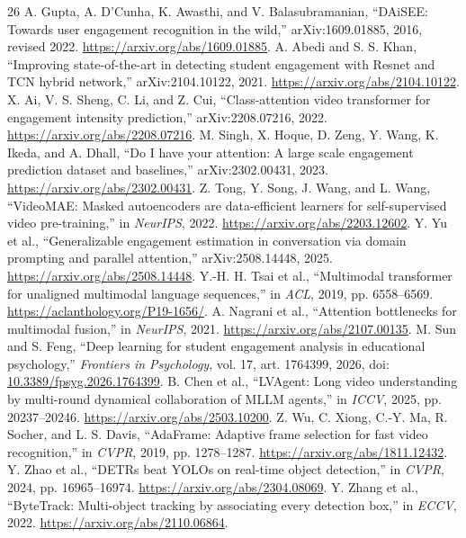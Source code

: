 \documentclass[a4paper,conference]{IEEEtran}
\begin{document}
\begin{thebibliography}{26}
 A. Gupta, A. D'Cunha, K. Awasthi, and V. Balasubramanian, ``DAiSEE: Towards user engagement recognition in the wild,'' arXiv:1609.01885, 2016, revised 2022. \url{https://arxiv.org/abs/1609.01885}.
 A. Abedi and S. S. Khan, ``Improving state-of-the-art in detecting student engagement with Resnet and TCN hybrid network,'' arXiv:2104.10122, 2021. \url{https://arxiv.org/abs/2104.10122}.
 X. Ai, V. S. Sheng, C. Li, and Z. Cui, ``Class-attention video transformer for engagement intensity prediction,'' arXiv:2208.07216, 2022. \url{https://arxiv.org/abs/2208.07216}.
 M. Singh, X. Hoque, D. Zeng, Y. Wang, K. Ikeda, and A. Dhall, ``Do I have your attention: A large scale engagement prediction dataset and baselines,'' arXiv:2302.00431, 2023. \url{https://arxiv.org/abs/2302.00431}.
 Z. Tong, Y. Song, J. Wang, and L. Wang, ``VideoMAE: Masked autoencoders are data-efficient learners for self-supervised video pre-training,'' in \emph{NeurIPS}, 2022. \url{https://arxiv.org/abs/2203.12602}.
 Y. Yu et al., ``Generalizable engagement estimation in conversation via domain prompting and parallel attention,'' arXiv:2508.14448, 2025. \url{https://arxiv.org/abs/2508.14448}.
 Y.-H. H. Tsai et al., ``Multimodal transformer for unaligned multimodal language sequences,'' in \emph{ACL}, 2019, pp. 6558--6569. \url{https://aclanthology.org/P19-1656/}.
 A. Nagrani et al., ``Attention bottlenecks for multimodal fusion,'' in \emph{NeurIPS}, 2021. \url{https://arxiv.org/abs/2107.00135}.
 M. Sun and S. Feng, ``Deep learning for student engagement analysis in educational psychology,'' \emph{Frontiers in Psychology}, vol. 17, art. 1764399, 2026, doi: \href{https://doi.org/10.3389/fpsyg.2026.1764399}{10.3389/fpsyg.2026.1764399}.
 B. Chen et al., ``LVAgent: Long video understanding by multi-round dynamical collaboration of MLLM agents,'' in \emph{ICCV}, 2025, pp. 20237--20246. \url{https://arxiv.org/abs/2503.10200}.
 Z. Wu, C. Xiong, C.-Y. Ma, R. Socher, and L. S. Davis, ``AdaFrame: Adaptive frame selection for fast video recognition,'' in \emph{CVPR}, 2019, pp. 1278--1287. \url{https://arxiv.org/abs/1811.12432}.
 Y. Zhao et al., ``DETRs beat YOLOs on real-time object detection,'' in \emph{CVPR}, 2024, pp. 16965--16974. \url{https://arxiv.org/abs/2304.08069}.
 Y. Zhang et al., ``ByteTrack: Multi-object tracking by associating every detection box,'' in \emph{ECCV}, 2022. \url{https://arxiv.org/abs/2110.06864}.

\end{thebibliography}
\end{document}

